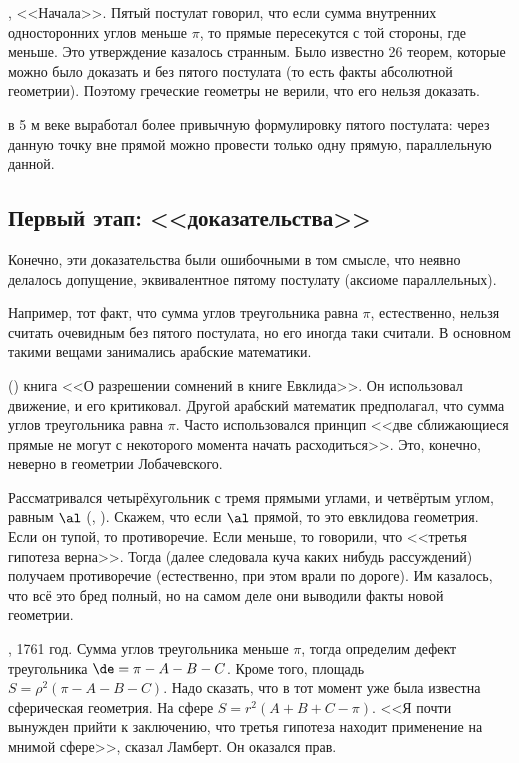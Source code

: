 \documentclass[a4paper,oneside,fleqn,10pt]{article}
\begin{document}
, <<Начала>>. Пятый постулат говорил, что если сумма внутренних односторонних
углов меньше $\pi$, то прямые пересекутся с той стороны, где меньше.
Это утверждение казалось странным. Было известно 26 теорем,
которые можно было доказать и без пятого постулата (то есть факты абсолютной геометрии).
Поэтому греческие геометры не верили, что его нельзя доказать.

 в 5 м веке выработал более привычную формулировку пятого постулата:
через данную точку вне прямой можно провести только одну прямую, параллельную данной.

\subsection{Первый этап: <<доказательства>>}

Конечно, эти доказательства были ошибочными в том смысле, что неявно делалось
допущение, эквивалентное пятому постулату (аксиоме параллельных).

Например, тот факт, что сумма углов треугольника равна $\pi$, естественно,
нельзя считать очевидным без пятого постулата, но его иногда таки считали.
В основном такими вещами занимались арабские математики.

 () книга <<О разрешении сомнений в книге Евклида>>.
Он использовал движение, и  его критиковал.
Другой арабский математик  предполагал, что сумма углов треугольника равна $\pi$.
Часто использовался принцип <<две сближающиеся прямые не могут
с некоторого момента начать расходиться>>. Это, конечно, неверно
в геометрии Лобачевского.

Рассматривался четырёхугольник с тремя прямыми углами, и четвёртым углом, равным $\al$ (, ).
Скажем, что если $\al$ прямой, то это евклидова геометрия.
Если он тупой, то противоречие. Если меньше, то говорили, что <<третья гипотеза верна>>.
Тогда (далее следовала куча каких нибудь рассуждений) получаем противоречие
(естественно, при этом врали по дороге).
Им казалось, что всё это бред полный, но на самом деле они выводили
факты новой геометрии.

, 1761 год. Сумма углов треугольника меньше $\pi$, тогда определим дефект
треугольника $\de = \pi - A - B - C$. Кроме того, площадь $S = \rho^2(\pi - A - B - C)$.
Надо сказать, что в тот момент уже была известна сферическая геометрия. На сфере $S = r^2(A + B + C - \pi)$.
<<Я почти вынужден прийти к заключению, что третья гипотеза находит применение на мнимой
сфере>>, сказал Ламберт. Он оказался прав.
\end{document}
